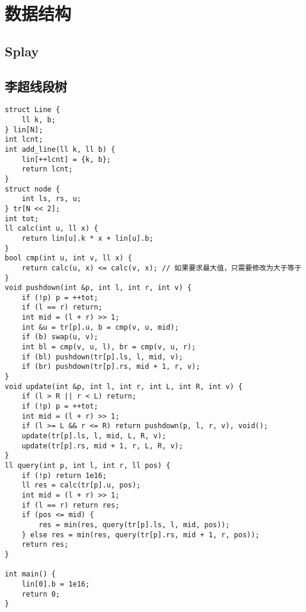 \documentclass[a4paper]{article}
\begin{document}
\section{数据结构}
\subsection{Splay}

\subsection{李超线段树}
\begin{lstlisting}
struct Line {
	ll k, b;
} lin[N];
int lcnt;
int add_line(ll k, ll b) {
	lin[++lcnt] = {k, b};
	return lcnt;
}
struct node {
	int ls, rs, u;
} tr[N << 2];
int tot;
ll calc(int u, ll x) {
	return lin[u].k * x + lin[u].b;
}
bool cmp(int u, int v, ll x) {
	return calc(u, x) <= calc(v, x); // 如果要求最大值，只需要修改为大于等于
}
void pushdown(int &p, int l, int r, int v) {
	if (!p) p = ++tot;
	if (l == r) return;
	int mid = (l + r) >> 1;
	int &u = tr[p].u, b = cmp(v, u, mid);
	if (b) swap(u, v);
	int bl = cmp(v, u, l), br = cmp(v, u, r);
	if (bl) pushdown(tr[p].ls, l, mid, v);
	if (br) pushdown(tr[p].rs, mid + 1, r, v);
}
void update(int &p, int l, int r, int L, int R, int v) {
	if (l > R || r < L) return;
	if (!p) p = ++tot;
	int mid = (l + r) >> 1;
	if (l >= L && r <= R) return pushdown(p, l, r, v), void();
	update(tr[p].ls, l, mid, L, R, v);
	update(tr[p].rs, mid + 1, r, L, R, v);
}
ll query(int p, int l, int r, ll pos) {
	if (!p) return 1e16;
	ll res = calc(tr[p].u, pos);
	int mid = (l + r) >> 1;
	if (l == r) return res;
	if (pos <= mid) {
		res = min(res, query(tr[p].ls, l, mid, pos));
	} else res = min(res, query(tr[p].rs, mid + 1, r, pos));
	return res;
}

int main() {
	lin[0].b = 1e16;
	return 0;	
}
\end{lstlisting}
\end{document}
